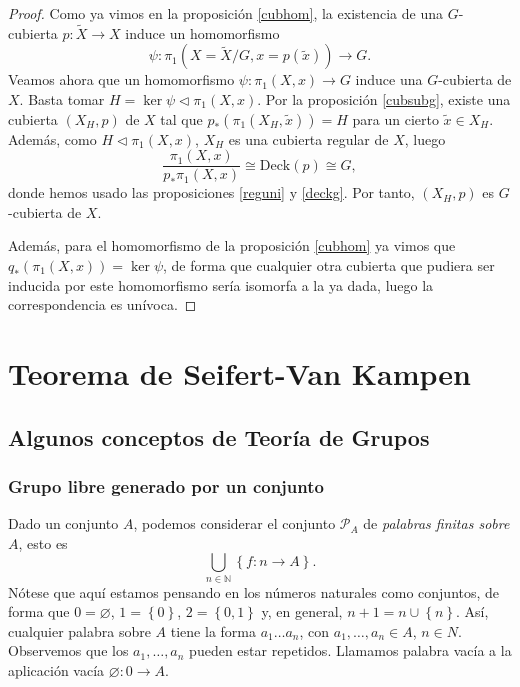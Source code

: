 \documentclass[12pt,a4paper]{book}
\theoremstyle{definition} \newtheorem{defn}[thm]{Definición}
\theoremstyle{definition} \newtheorem{ejemplo}[thm]{Ejemplo}
\theoremstyle{definition} \newtheorem{ejercicio}[thm]{Ejercicio}
\theoremstyle{remark} \newtheorem*{obs}{Observación}
\def\NN{\mathbb{N}}
\def\gf{\pi_1}
\def\XX{\tilde{X}}
\def\xx{\tilde{x}}
\def\DD{\mathrm{Deck}}
\begin{document}
\begin{proof}
  Como ya vimos en la proposición \ref{cubhom}, la existencia de una $G$-cubierta $p:\XX\rightarrow X$ induce un homomorfismo 
  \begin{equation*}
    \psi:\gf(X=\XX/G,x=p(\xx))\rightarrow G.
  \end{equation*}
  Veamos ahora que un homomorfismo $\psi:\gf(X,x)\rightarrow G$ induce una $G$-cubierta de $X$. Basta tomar $H=\ker\psi \lhd \gf(X,x)$. Por la proposición \ref{cubsubg}, existe una cubierta $(X_H,p)$ de $X$ tal que $p_*(\gf(X_H,\xx))=H$ para un cierto $\xx \in X_H$. Además, como $H\lhd \gf(X,x)$, $X_H$ es una cubierta regular de $X$, luego
  \begin{equation*}
    \frac{\gf(X,x)}{p_*\gf(X,x)}\cong \DD(p) \cong G,
  \end{equation*}
  donde hemos usado las proposiciones \ref{reguni} y \ref{deckg}. Por tanto, $(X_H,p)$ es $G$-cubierta de $X$.

  Además, para el homomorfismo de la proposición \ref{cubhom} ya vimos que $q_*(\gf(X,x))=\ker \psi$, de forma que cualquier otra cubierta que pudiera ser inducida por este homomorfismo sería isomorfa a la ya dada, luego la correspondencia es unívoca.
\end{proof}

\chapter{Teorema de Seifert-Van Kampen}
\section{Algunos conceptos de Teoría de Grupos}
\subsection{Grupo libre generado por un conjunto}
Dado un conjunto $A$, podemos considerar el conjunto $\mathcal{P}_A$ de \emph{palabras finitas sobre $A$}, esto es
\begin{equation*}
  \bigcup_{n\in \NN} \left\{ f:n\rightarrow A \right\}.
\end{equation*}
Nótese que aquí estamos pensando en los números naturales como conjuntos, de forma que $0=\varnothing$, $1=\left\{ 0 \right\}$, $2=\left\{ 0,1 \right\}$ y, en general, $n+1=n\cup \left\{ n \right\}$.
Así, cualquier palabra sobre $A$ tiene la forma $a_1\dots a_n$, con $a_1,\dots,a_n \in A$, $n\in N$. Observemos que los $a_1,\dots,a_n$ pueden estar repetidos. Llamamos palabra vacía a la aplicación vacía $\varnothing:0\rightarrow A$. 
\end{document}
